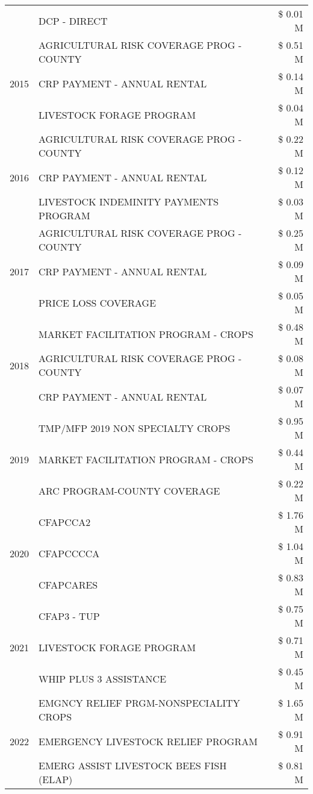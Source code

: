 \begin{tabular}{llr}
 & DCP - DIRECT & \$ 0.01 M \\
\cline{1-3}
\multirow[t]{3}{*}{2015} & AGRICULTURAL RISK COVERAGE PROG - COUNTY & \$ 0.51 M \\
 & CRP PAYMENT - ANNUAL RENTAL & \$ 0.14 M \\
 & LIVESTOCK FORAGE PROGRAM & \$ 0.04 M \\
\cline{1-3}
\multirow[t]{3}{*}{2016} & AGRICULTURAL RISK COVERAGE PROG - COUNTY & \$ 0.22 M \\
 & CRP PAYMENT - ANNUAL RENTAL & \$ 0.12 M \\
 & LIVESTOCK INDEMINITY PAYMENTS PROGRAM & \$ 0.03 M \\
\cline{1-3}
\multirow[t]{3}{*}{2017} & AGRICULTURAL RISK COVERAGE PROG - COUNTY & \$ 0.25 M \\
 & CRP PAYMENT - ANNUAL RENTAL & \$ 0.09 M \\
 & PRICE LOSS COVERAGE & \$ 0.05 M \\
\cline{1-3}
\multirow[t]{3}{*}{2018} & MARKET FACILITATION PROGRAM - CROPS & \$ 0.48 M \\
 & AGRICULTURAL RISK COVERAGE PROG - COUNTY & \$ 0.08 M \\
 & CRP PAYMENT - ANNUAL RENTAL & \$ 0.07 M \\
\cline{1-3}
\multirow[t]{3}{*}{2019} & TMP/MFP 2019 NON SPECIALTY CROPS & \$ 0.95 M \\
 & MARKET FACILITATION PROGRAM - CROPS & \$ 0.44 M \\
 & ARC PROGRAM-COUNTY COVERAGE & \$ 0.22 M \\
\cline{1-3}
\multirow[t]{3}{*}{2020} & CFAPCCA2 & \$ 1.76 M \\
 & CFAPCCCCA & \$ 1.04 M \\
 & CFAPCARES & \$ 0.83 M \\
\cline{1-3}
\multirow[t]{3}{*}{2021} & CFAP3 - TUP & \$ 0.75 M \\
 & LIVESTOCK FORAGE PROGRAM & \$ 0.71 M \\
 & WHIP PLUS 3 ASSISTANCE & \$ 0.45 M \\
\cline{1-3}
\multirow[t]{3}{*}{2022} & EMGNCY RELIEF PRGM-NONSPECIALITY CROPS & \$ 1.65 M \\
 & EMERGENCY LIVESTOCK RELIEF PROGRAM & \$ 0.91 M \\
 & EMERG ASSIST LIVESTOCK BEES FISH (ELAP) & \$ 0.81 M \\
\cline{1-3}
\bottomrule
\end{tabular}
